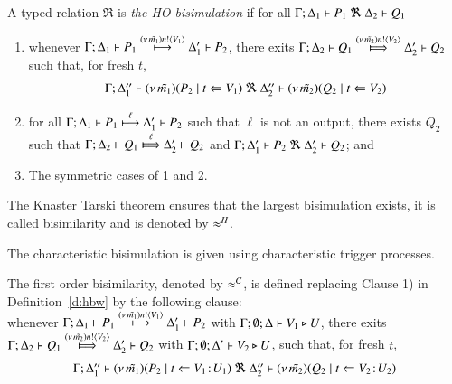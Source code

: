 \smallskip 

\begin{definition}\rm
	\label{d:hbw}
A typed relation $\Re$ is {\em the HO bisimulation} if 
for all $\horel{\Gamma}{\Delta_1}{P_1}{\ \Re \ }{\Delta_2}{Q_1}$ 
\begin{enumerate}
\item 
whenever 
$\Gamma; \Delta_1 \vdash P_1 \stackrel{(\nu\, \tilde{m_1}) n ! \langle V_1 \rangle}{\longmapsto} \Delta_1' \vdash P_2$, there exits 
$\horel{\Gamma}{\Delta_2}{Q_1}{\Hby{\news{\tilde{m_2}} \bactout{n}{V_2}}}{\Delta_2'}{Q_2}$ such that, for fresh $t$, 
\[
\begin{array}{lrlll}
\Gamma; \Delta''_1  \vdash  {(\nu\, \tilde{m_1})(P_2 \;|\;t \Leftarrow V_1)}
\ \Re 
\ \Delta''_2 \vdash {(\nu\, \tilde{m_2})(Q_2 \;|\;t \Leftarrow V_2)}
\end{array}
\]
		\item	
for all $\Gamma; \Delta_1 \vdash P_1 \stackrel{\ell}{\longmapsto} \Delta_1' \vdash P_2$ such that 
$\ell$ is not an output, 
 there exists $Q_2$ such that 
$\horel{\Gamma}{\Delta_2}{Q_1}{\Hby{\ell}}{\Delta_2'}{Q_2}$
			and
			$\horel{\Gamma}{\Delta_1'}{P_2}{\ \Re \ }{\Delta_2'}{Q_2}$; and 

                      \item	The symmetric cases of 1 and 2.                
	\end{enumerate}
	The Knaster Tarski theorem ensures that the largest bisimulation exists,
	it is called bisimilarity and is denoted by $\approx^H$.
\end{definition}

\smallskip 

The characteristic bisimulation is given using 
characteristic trigger processes. 

\smallskip 

\begin{definition}\rm
\label{d:fwb}
The first order bisimilarity, denoted by $\approx^C$, is defined replacing 
Clause 1) in Definition~\ref{d:hbw} by the following clause:\\[1mm]
whenever 
$\Gamma; \Delta_1 \vdash P_1 \stackrel{(\nu\, \tilde{m_1}) n ! \langle V_1 \rangle}{\longmapsto} \Delta_1' \vdash P_2$ with $\Gamma; \emptyset; \Delta \vdash V_1 \triangleright U$,  
there exits 
$\horel{\Gamma}{\Delta_2}{Q_1}{\Hby{\news{\tilde{m_2}}\bactout{n}{V_2}}}{\Delta_2'}{Q_2}$ with $\Gamma; \emptyset; \Delta' \vdash V_2 \triangleright U$,  
such that, for fresh $t$, 
\[
\begin{array}{lrlll}
\Gamma; \Delta''_1  \vdash  {(\nu\, \tilde{m_1})(P_2 \;|\;t \Leftarrow V_1 \! : \! U_1)}
\ \Re 
\ \Delta''_2 \vdash {(\nu\, \tilde{m_2})(Q_2 \;|\;t \Leftarrow V_2 \! : \! U_2)}
\end{array}
\]
\end{definition}

